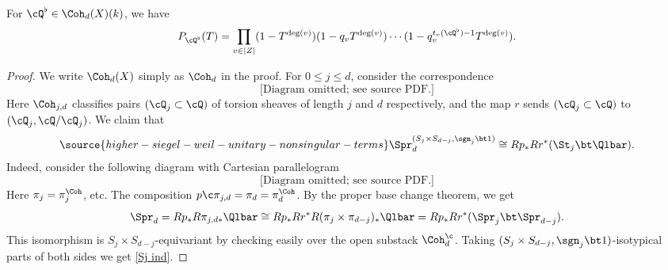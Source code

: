 \begin{prop}
\notready\label{p:PQ Coh trace} For $\cQ^{\flat}\in \Coh_{d}(X)(k)$, we have
\begin{equation*}
P_{\cQ^{\flat}}(T)=\prod_{v\in |Z|}(1-T^{\deg(v)})(1-q_{v}T^{\deg(v)})\cdots (1-q_{v}^{t_{v}(\cQ^{\flat})-1}T^{\deg(v)}).
\end{equation*}
\end{prop}
\begin{proof} We write $\Coh_{d}(X)$ simply as $\Coh_{d}$ in the proof. For $0\le j\le d$, consider the correspondence
\begin{equation*}
\text{[Diagram omitted; see source PDF.]}
\end{equation*}
Here $\Coh_{j,d}$ classifies pairs $(\cQ_{j}\subset \cQ)$ of torsion sheaves of length $j$ and $d$ respectively, and the map $r$ sends $(\cQ_{j}\subset \cQ)$ to $(\cQ_{j}, \cQ/\cQ_j)$. We claim that
\begin{equation}\label{Sj ind}
\source{higher-siegel-weil-unitary-nonsingular-terms}
\Spr_{d}^{(S_{j}\times S_{d-j}, \sgn_{j}\bt1)}\cong Rp_{*}Rr^{*}(\St_{j}\bt\Qlbar).
\end{equation}
Indeed, consider the following diagram with Cartesian parallelogram
\begin{equation*}
\text{[Diagram omitted; see source PDF.]}
\end{equation*}
Here $\pi_{j}=\pi_{j}^{\Coh}$, etc. The composition $p\c \pi_{j,d}=\pi_{d}=\pi^{\Coh}_{d}$. By the proper base change theorem, we get
\begin{equation*}
\Spr_{d}=Rp_{*}R\pi_{j,d*}\Qlbar\cong Rp_{*}Rr^{*}R(\pi_{j}\times\pi_{d-j})_{*}\Qlbar=Rp_{*}Rr^{*}(\Spr_{j}\bt\Spr_{d-j}).
\end{equation*}
This isomorphism is $S_{j}\times S_{d-j}$-equivariant by checking easily over the open substack $\Coh_{d}^{\c}$. Taking $(S_{j}\times S_{d-j},\sgn_{j}\bt1)$-isotypical parts of both sides we get \eqref{Sj ind}.


\end{proof}
